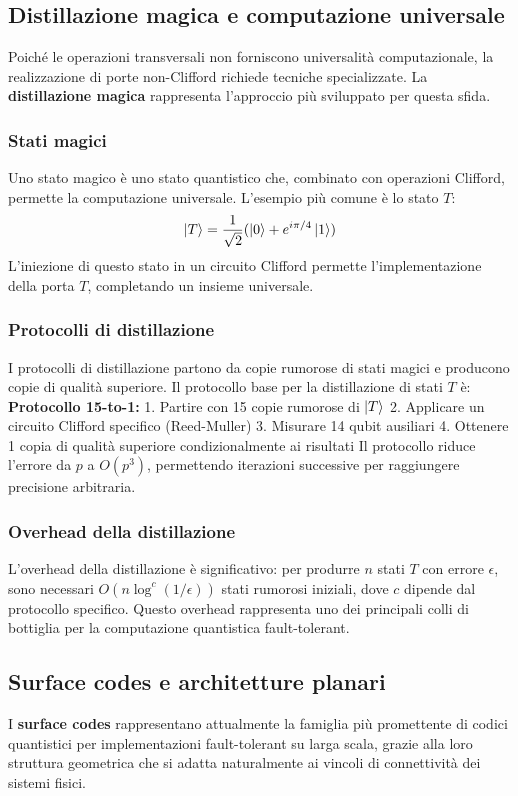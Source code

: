 \documentclass[a4paper,12pt]{report}
\theoremstyle{plain}
\begin{document}
\subsection{Distillazione magica e computazione universale}
Poiché le operazioni transversali non forniscono universalità computazionale, la realizzazione di porte non-Clifford richiede tecniche specializzate. La \textbf{distillazione magica} rappresenta l'approccio più sviluppato per questa sfida.
\subsubsection{Stati magici}
Uno stato magico è uno stato quantistico che, combinato con operazioni Clifford, permette la computazione universale. L'esempio più comune è lo stato $T$:
\[
\ket{T} = \frac{1}{\sqrt{2}}(\ket{0} + e^{i\pi/4}\ket{1})
\]
L'iniezione di questo stato in un circuito Clifford permette l'implementazione della porta $T$, completando un insieme universale.
\subsubsection{Protocolli di distillazione}
I protocolli di distillazione partono da copie rumorose di stati magici e producono copie di qualità superiore. Il protocollo base per la distillazione di stati $T$ è:
\textbf{Protocollo 15-to-1:}
1. Partire con 15 copie rumorose di $\ket{T}$
2. Applicare un circuito Clifford specifico (Reed-Muller)
3. Misurare 14 qubit ausiliari
4. Ottenere 1 copia di qualità superiore condizionalmente ai risultati
Il protocollo riduce l'errore da $p$ a $O(p^3)$, permettendo iterazioni successive per raggiungere precisione arbitraria.
\subsubsection{Overhead della distillazione}
L'overhead della distillazione è significativo: per produrre $n$ stati $T$ con errore $\epsilon$, sono necessari $O(n \log^c(1/\epsilon))$ stati rumorosi iniziali, dove $c$ dipende dal protocollo specifico. Questo overhead rappresenta uno dei principali colli di bottiglia per la computazione quantistica fault-tolerant.
\subsection{Surface codes e architetture planari}
I \textbf{surface codes} rappresentano attualmente la famiglia più promettente di codici quantistici per implementazioni fault-tolerant su larga scala, grazie alla loro struttura geometrica che si adatta naturalmente ai vincoli di connettività dei sistemi fisici.
\end{document}
